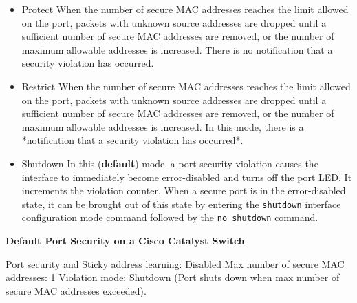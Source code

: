 \documentclass[../EngineeringJournal_CDavis.tex]{subfiles}
\begin{document}

\hspace{0.2cm}
\begin{tcolorbox}[width=6.3in]
\scriptsize 
\begin{itemize}
  \item{Protect}  When the number of secure MAC addresses reaches the limit allowed on the port, packets with unknown source addresses are dropped until a sufficient number of secure MAC addresses are removed, or the number of maximum allowable addresses is increased. There is no notification that a security violation has occurred.
  \item{Restrict}  When the number of secure MAC addresses reaches the limit allowed on the port, packets with unknown source addresses are dropped until a sufficient number of secure MAC addresses are removed, or the number of maximum allowable addresses is increased. In this mode, there is a *notification that a security violation has occurred*.
  \item{Shutdown}  In this ({\bf{default}}) mode, a port security violation causes the 
      \subitem{} interface to immediately become error-disabled and turns off the port LED. It increments the violation counter. 
        \subitem{} When a secure port is in the error-disabled state, it can be
	brought out of this state by entering the
	{\verb$shutdown$}  interface configuration mode
	command followed by the {\verb$no shutdown$} command.
\end{itemize}
\end{tcolorbox}
\hspace{0.2cm}
\normalsize  



\hspace{0.2cm}
\begin{tcolorbox}[width=6.3in]
  {\bf{Default Port Security on a Cisco Catalyst Switch}}
\scriptsize 
  \begin{outline}
    \1 Port security and Sticky address learning: Disabled
    \1 Max number of secure MAC addresses: 1
    \1 Violation mode: Shutdown (Port shuts down when max number of secure MAC addresses exceeded).
  \end{outline}
\end{tcolorbox}
\hspace{0.2cm}
\normalsize  
\end{document}
